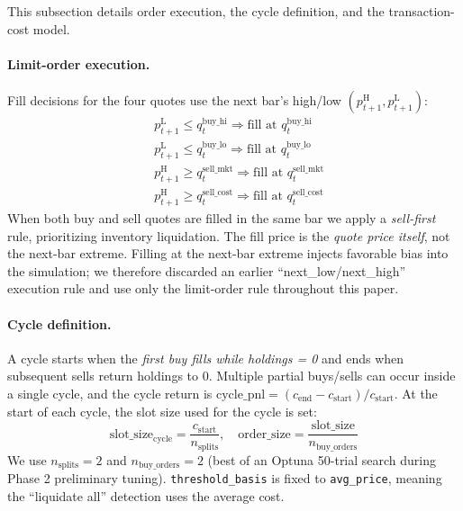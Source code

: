\documentclass[11pt, a4paper]{article}
\begin{document}
This subsection details order execution, the cycle definition, and the
transaction-cost model.

\paragraph{Limit-order execution.}
Fill decisions for the four quotes use the next bar's high/low
$(p^{\mathrm{H}}_{t+1}, p^{\mathrm{L}}_{t+1})$:
\begin{equation}
\begin{aligned}
&p^{\mathrm{L}}_{t+1} \leq q^{\mathrm{buy\_hi}}_t  \Rightarrow
\text{fill at $q^{\mathrm{buy\_hi}}_t$} \\
&p^{\mathrm{L}}_{t+1} \leq q^{\mathrm{buy\_lo}}_t  \Rightarrow
\text{fill at $q^{\mathrm{buy\_lo}}_t$} \\
&p^{\mathrm{H}}_{t+1} \geq q^{\mathrm{sell\_mkt}}_t \Rightarrow
\text{fill at $q^{\mathrm{sell\_mkt}}_t$} \\
&p^{\mathrm{H}}_{t+1} \geq q^{\mathrm{sell\_cost}}_t \Rightarrow
\text{fill at $q^{\mathrm{sell\_cost}}_t$}
\end{aligned}
\end{equation}
When both buy and sell quotes are filled in the same bar we apply a
\emph{sell-first} rule, prioritizing inventory liquidation. The fill price is
the \emph{quote price itself}, not the next-bar extreme. Filling at the
next-bar extreme injects favorable bias into the simulation; we therefore
discarded an earlier ``next\_low/next\_high'' execution rule and use only the
limit-order rule throughout this paper.

\paragraph{Cycle definition.}
A cycle starts when the \emph{first buy fills while holdings = 0} and ends
when subsequent sells return holdings to 0. Multiple partial buys/sells can
occur inside a single cycle, and the cycle return is
$\mathrm{cycle\_pnl} = (c_{\text{end}} - c_{\text{start}}) / c_{\text{start}}$.
At the start of each cycle, the slot size used for the cycle is set:
\begin{equation}
\text{slot\_size}_{\text{cycle}} =
\frac{c_{\text{start}}}{n_{\text{splits}}}, \quad
\text{order\_size} = \frac{\text{slot\_size}}{n_{\text{buy\_orders}}}
\end{equation}
We use $n_{\text{splits}}=2$ and $n_{\text{buy\_orders}}=2$ (best of an Optuna
50-trial search during Phase 2 preliminary tuning). \texttt{threshold\_basis}
is fixed to
\texttt{avg\_price}, meaning the ``liquidate all'' detection uses the average
cost.
\end{document}
